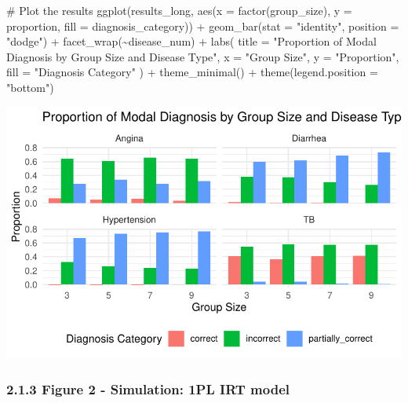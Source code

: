 \documentclass[
  letterpaper,
  DIV=11,
  numbers=noendperiod]{scrartcl}
\newenvironment{Shaded}{\begin{snugshade}}{\end{snugshade}}
\newcommand{\AttributeTok}[1]{\textcolor[rgb]{0.40,0.45,0.13}{#1}}
\newcommand{\CommentTok}[1]{\textcolor[rgb]{0.37,0.37,0.37}{#1}}
\newcommand{\FunctionTok}[1]{\textcolor[rgb]{0.28,0.35,0.67}{#1}}
\newcommand{\NormalTok}[1]{\textcolor[rgb]{0.00,0.23,0.31}{#1}}
\newcommand{\SpecialCharTok}[1]{\textcolor[rgb]{0.37,0.37,0.37}{#1}}
\newcommand{\StringTok}[1]{\textcolor[rgb]{0.13,0.47,0.30}{#1}}
\begin{document}
\begin{Shaded}
\begin{Highlighting}[]
\CommentTok{\# Plot the results}
\FunctionTok{ggplot}\NormalTok{(results\_long, }\FunctionTok{aes}\NormalTok{(}\AttributeTok{x =} \FunctionTok{factor}\NormalTok{(group\_size), }\AttributeTok{y =}\NormalTok{ proportion, }\AttributeTok{fill =}\NormalTok{ diagnosis\_category)) }\SpecialCharTok{+}
  \FunctionTok{geom\_bar}\NormalTok{(}\AttributeTok{stat =} \StringTok{"identity"}\NormalTok{, }\AttributeTok{position =} \StringTok{"dodge"}\NormalTok{) }\SpecialCharTok{+}
  \FunctionTok{facet\_wrap}\NormalTok{(}\SpecialCharTok{\textasciitilde{}}\NormalTok{disease\_num) }\SpecialCharTok{+}
  \FunctionTok{labs}\NormalTok{(}
    \AttributeTok{title =} \StringTok{"Proportion of Modal Diagnosis by Group Size and Disease Type"}\NormalTok{,}
    \AttributeTok{x =} \StringTok{"Group Size"}\NormalTok{,}
    \AttributeTok{y =} \StringTok{"Proportion"}\NormalTok{,}
    \AttributeTok{fill =} \StringTok{"Diagnosis Category"}
\NormalTok{  ) }\SpecialCharTok{+}
  \FunctionTok{theme\_minimal}\NormalTok{() }\SpecialCharTok{+}
  \FunctionTok{theme}\NormalTok{(}\AttributeTok{legend.position =} \StringTok{"bottom"}\NormalTok{)}
\end{Highlighting}
\end{Shaded}

\includegraphics{simulation_files/figure-pdf/unnamed-chunk-3-1.pdf}

\subsubsection{2.1.3 Figure 2 - Simulation: 1PL IRT
model}\label{figure-2---simulation-1pl-irt-model}
\end{document}
